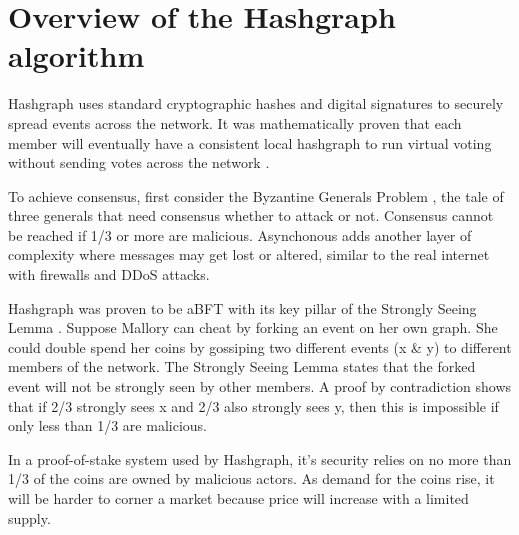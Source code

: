 \section{Overview of the Hashgraph algorithm}



Hashgraph uses standard cryptographic hashes and digital signatures to securely spread events across the network. It was mathematically proven that each member will eventually have a consistent local hashgraph to run virtual voting without sending votes across the network \cite{baird2016}.

To achieve consensus, first consider the Byzantine Generals Problem \cite{shostak1982byzantine}, the tale of three generals that need consensus whether to attack or not. Consensus cannot be reached if 1/3 or more are malicious. Asynchonous adds another layer of complexity where messages may get lost or altered, similar to the real internet with firewalls and DDoS attacks.

Hashgraph was proven to be aBFT with its key pillar of the Strongly Seeing Lemma \cite{baird2016}. Suppose Mallory can cheat by forking an event on her own graph. She could double spend her coins by gossiping two different events (x \& y) to different members of the network. The Strongly Seeing Lemma states that the forked event will not be strongly seen by other members. A proof by contradiction shows that if 2/3 strongly sees x and 2/3 also strongly sees y, then this is impossible if only less than 1/3 are malicious.

In a proof-of-stake system used by Hashgraph, it's security relies on no more than 1/3 of the coins are owned by malicious actors. As demand for the coins rise, it will be harder to corner a market because price will increase with a limited supply.

